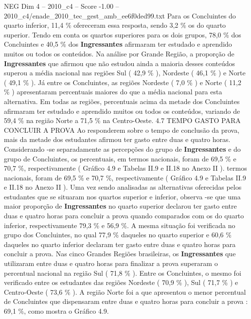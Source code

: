 \begin{textsample}{NEG Dim 4 – 2010\_c4 – Score -1.00 – 2010\_c4/enade\_2010\_tec\_gest\_amb\_ee6f0ded99.txt}
Para os Concluintes do quarto inferior, 11,4 \% ofereceram essa resposta, sendo 3,2 \% os do quarto superior.
Tendo em conta os quartos superiores para os dois grupos, 78,0 \% dos Concluintes e 40,5 \% dos \textbf{Ingressantes} afirmaram ter estudado e aprendido muitos ou todos os conteúdos.
Na análise por Grande Região, a proporção de \textbf{Ingressantes} que afirmou que não estudou ainda a maioria desses conteúdos superou a média nacional nas regiões Sul ( 42,9 \% ), Nordeste ( 46,1 \% ) e Norte ( 49,1 \% ).
Já entre os Concluintes, as regiões Nordeste ( 7,0 \% ) e Norte ( 11,2 \% ) apresentaram percentuais maiores do que a média nacional para esta alternativa.
Em todas as regiões, percentuais acima da metade dos Concluintes afirmaram ter estudado e aprendido muitos ou todos os conteúdos, variando de 59,4 \% na região Norte a 71,5 \% na Centro-Oeste. 4.7 TEMPO GASTO PARA CONCLUIR A PROVA Ao responderem sobre o tempo de conclusão da prova, mais da metade dos estudantes afirmou ter gasto entre duas e quatro horas.
Considerando -se separadamente as percepções do grupo de \textbf{Ingressantes} e do grupo de Concluintes, os percentuais, em termos nacionais, foram de 69,5 \% e 70,7 \%, respectivamente ( Gráfico 4.9 e Tabelas II.9 e II.18 no Anexo II ). termos nacionais, foram de 69,5 \% e 70,7 \%, respectivamente ( Gráfico 4.9 e Tabelas II.9 e II.18 no Anexo II ).
Uma vez sendo analisadas as alternativas oferecidas pelos estudantes que se situaram nos quartos superior e inferior, observa -se que uma maior proporção de \textbf{Ingressantes} no quarto superior declarou ter gasto entre duas e quatro horas para concluir a prova quando comparados com os do quarto inferior, respectivamente 79,3 \% e 56,9 \%.
A mesma situação foi verificada no grupo dos Concluintes, no qual 77,9 \% daqueles no quarto superior e 60,6 \% daqueles no quarto inferior declaram ter gasto entre duas e quatro horas para concluir a prova.
Nas cinco Grandes Regiões brasileiras, os \textbf{Ingressantes} que utilizaram entre duas e quatro horas para finalizar a prova superaram o percentual nacional na região Sul ( 71,8 \% ).
Entre os Concluintes, o mesmo foi verificado entre os estudantes das regiões Nordeste ( 70,9 \% ), Sul ( 71,7 \% ) e Centro-Oeste ( 73,6 \% ).
A região Norte foi a que apresentou o menor percentual de Concluintes que dispensaram entre duas e quatro horas para concluir a prova : 69,1 \%, como mostra o Gráfico 4.9.

\end{textsample}
